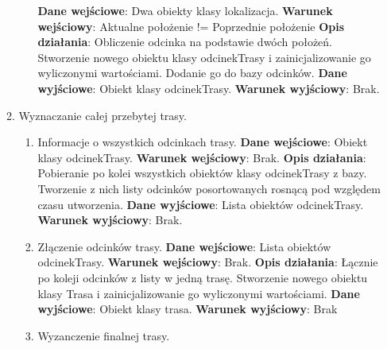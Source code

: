 \documentclass[11pt]{article}
\begin{document}
\begin{enumerate}
\begin{enumerate}[label*=\arabic*.]
\begin{enumerate}[label*=\arabic*.]
				\textbf{Dane wejściowe}: Dwa obiekty klasy lokalizacja.	\newline
				\textbf{Warunek wejściowy}: Aktualne położenie != Poprzednie położenie		\newline   	
				\textbf{Opis działania}: \newline Obliczenie odcinka na podstawie dwóch położeń. \newline Stworzenie nowego obiektu klasy odcinekTrasy i zainicjalizowanie go wyliczonymi wartościami. \newline Dodanie go do bazy odcinków.	\newline
				\textbf{Dane wyjściowe}: Obiekt klasy odcinekTrasy.	\newline
				\textbf{Warunek wyjściowy}: Brak.
			\end{enumerate}
			\item Wyznaczanie całej przebytej trasy.
			\begin{enumerate}[label*=\arabic*.]
				\item Informacje o wszystkich odcinkach trasy. \newline
				\textbf{Dane wejściowe}: Obiekt klasy odcinekTrasy.	\newline
				\textbf{Warunek wejściowy}: Brak.		\newline   	
				\textbf{Opis działania}: \newline Pobieranie po kolei wszystkich obiektów klasy odcinekTrasy z bazy. \newline Tworzenie z nich listy odcinków posortowanych rosnącą pod względem czasu utworzenia.	\newline
				\textbf{Dane wyjściowe}: Lista obiektów odcinekTrasy.	\newline
				\textbf{Warunek wyjściowy}: Brak.
				\item Złączenie odcinków trasy. \newline
				\textbf{Dane wejściowe}: Lista obiektów odcinekTrasy.	\newline
				\textbf{Warunek wejściowy}: Brak.		\newline   	
				\textbf{Opis działania}: \newline Łącznie po koleji odcinków z listy w jedną trasę. \newline Stworzenie nowego obiektu klasy Trasa i zainicjalizowanie go wyliczonymi wartościami.	\newline
				\textbf{Dane wyjściowe}: Obiekt klasy trasa.	\newline
				\textbf{Warunek wyjściowy}: Brak
				\item Wyzanczenie finalnej trasy. \newline

\end{enumerate}
\end{enumerate}
\end{enumerate}
\end{document}
